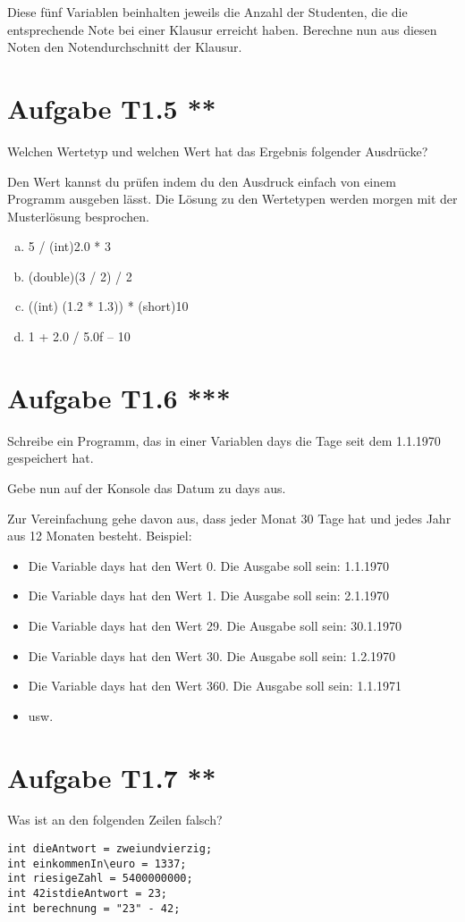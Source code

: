 \documentclass[final,a4paper]{article}
\begin{document}
Diese fünf Variablen beinhalten jeweils die Anzahl der Studenten, die die entsprechende Note bei einer Klausur erreicht haben. Berechne nun aus diesen Noten den Notendurchschnitt der Klausur.

\section*{Aufgabe T1.5 **}
Welchen Wertetyp und welchen Wert hat das Ergebnis folgender Ausdrücke? 

Den Wert kannst du prüfen indem du den Ausdruck einfach von einem Programm ausgeben lässt. Die Lösung zu den Wertetypen werden morgen mit der Musterlösung besprochen.
\begin{enumerate}[(a)]
\item 5 / (int)2.0 * 3
\item (double)(3 / 2) / 2
\item ((int) (1.2 * 1.3)) * (short)10
\item 1 + 2.0 / 5.0f – 10
\end{enumerate}


\section*{Aufgabe T1.6 ***}
Schreibe ein Programm, das in einer Variablen days die Tage seit dem 1.1.1970 gespeichert hat.

Gebe nun auf der Konsole das Datum zu days aus. 

Zur Vereinfachung gehe davon aus, dass jeder Monat 30 Tage hat und jedes Jahr aus 12 Monaten besteht.
Beispiel:
\begin{itemize}
\item Die Variable days hat den Wert 0. Die Ausgabe soll sein: 1.1.1970
\item Die Variable days hat den Wert 1. Die Ausgabe soll sein: 2.1.1970
\item Die Variable days hat den Wert 29. Die Ausgabe soll sein: 30.1.1970
\item Die Variable days hat den Wert 30. Die Ausgabe soll sein: 1.2.1970
\item Die Variable days hat den Wert 360. Die Ausgabe soll sein: 1.1.1971
\item usw.
\end{itemize}

\section*{Aufgabe T1.7 **}
Was ist an den folgenden Zeilen falsch?
\begin{lstlisting}
int dieAntwort = zweiundvierzig;
int einkommenIn\euro = 1337;
int riesigeZahl = 5400000000;
int 42istdieAntwort = 23; 
int berechnung = "23" - 42;
\end{lstlisting}
\end{document}
